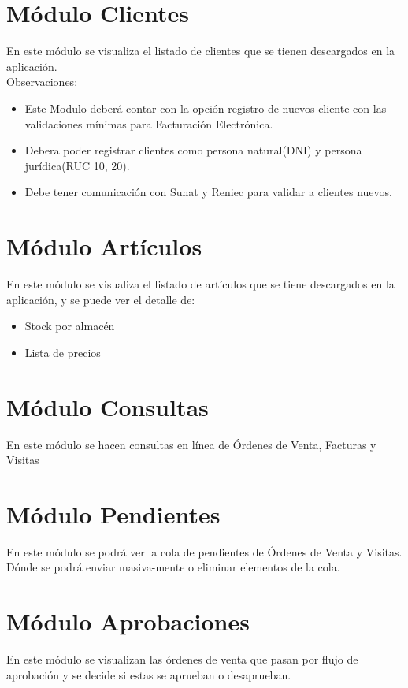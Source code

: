 \documentclass[pdftex,12pt,oneside,a4paper,spanish, english, brazil]{abntex2}
\begin{document}
\begin{sloppypar}
             \section{Módulo Clientes} 
             En este módulo se visualiza el listado de clientes que se tienen descargados en la aplicación.\\
             Observaciones:
             \begin{itemize}
             	\item Este Modulo deberá contar con la opción  registro de nuevos cliente con las validaciones mínimas para Facturación Electrónica.
             	\item Debera poder registrar clientes como persona natural(DNI) y persona jurídica(RUC 10, 20).
             	\item Debe tener comunicación con Sunat y Reniec para validar a clientes nuevos.
             \end{itemize}
             
             \section{Módulo Artículos}
             En este módulo se visualiza el listado de artículos que se tiene descargados en la aplicación, y se puede ver el detalle de:
             \begin{itemize}
             	\item Stock por almacén
             	\item Lista de precios
             \end{itemize}
             
             \section{Módulo Consultas}
             En este módulo se hacen consultas en línea de Órdenes de Venta, Facturas y Visitas
             
             \section{Módulo Pendientes}
             En este módulo se podrá ver la cola de pendientes de Órdenes de Venta y Visitas. Dónde se podrá enviar masiva-mente o eliminar elementos de la cola.
             
             \section{Módulo Aprobaciones}
             En este módulo se visualizan las órdenes de venta que pasan por flujo de aprobación y se decide si estas se aprueban o desaprueban.

\end{sloppypar}
\end{document}
